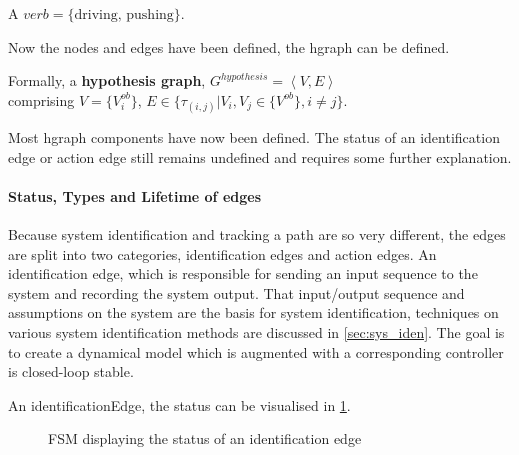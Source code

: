 A $verb = \{\textrm{driving, pushing}\}$.\bs

Now the nodes and edges have been defined, the \ac{hgraph} can be defined.\bs

Formally, a \textbf{hypothesis graph}, $G^{hypothesis} = \left\langle V, E \right\rangle $ 
\\comprising $V = \{V^{ob}_{i}\}$, \quad $E \in \{\tau_{(i,j)}| V_i, V_j \in \{V^{ob} \}, i \neq j\}$.\bs

Most \ac{hgraph} components have now been defined. The status of an identification edge or action edge still remains undefined and requires some further explanation.\bs

\paragraph{Status, Types and Lifetime of edges}
Because system identification and tracking a path are so very different, the edges are split into two categories, identification edges and action edges. An identification edge, which is responsible for sending an input sequence to the system and recording the system output. That input/output sequence and assumptions on the system are the basis for system identification, techniques on various system identification methods are discussed in \cref{sec:sys_iden}. The goal is to create a dynamical model which is augmented with a corresponding controller is closed-loop stable.\bs

An identificationEdge, the status can be visualised in \cref{tikz:status_identification_edge}.\bs

\begin{figure}[H]
\centering
{}
\caption{\acs{FSM} displaying the status of an identification edge}%
\label{tikz:status_identification_edge}
\end{figure}

